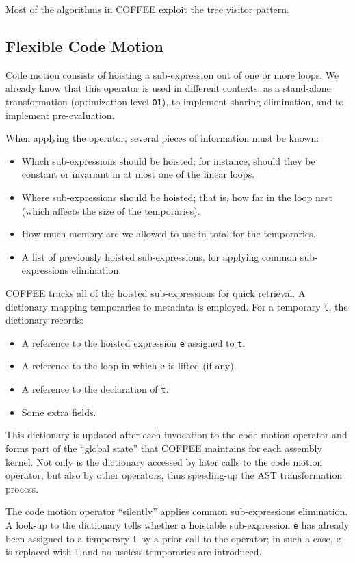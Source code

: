 Most of the algorithms in COFFEE exploit the tree visitor pattern.

\subsection{Flexible Code Motion}
\label{sec:coffee:cm}
Code motion consists of hoisting a sub-expression out of one or more loops. We already know that this operator is used in different contexts: as a stand-alone transformation (optimization level \texttt{O1}), to implement sharing elimination, and to implement pre-evaluation. 

When applying the operator, several pieces of information must be known:
\begin{itemize}
\item Which sub-expressions should be hoisted; for instance, should they be constant or invariant in at most one of the linear loops.
\item Where sub-expressions should be hoisted; that is, how far in the loop nest (which affects the size of the temporaries).
\item How much memory are we allowed to use in total for the temporaries.
\item A list of previously hoisted sub-expressions, for applying common sub-expressions elimination.
\end{itemize}

COFFEE tracks all of the hoisted sub-expressions for quick retrieval. A dictionary mapping temporaries to metadata is employed. For a temporary \texttt{t}, the dictionary records:
\begin{itemize}
\item A reference to the hoisted expression \texttt{e} assigned to \texttt{t}.
\item A reference to the loop in which \texttt{e} is lifted (if any).
\item A reference to the declaration of \texttt{t}.
\item Some extra fields.
\end{itemize}
This dictionary is updated after each invocation to the code motion operator and forms part of the ``global state'' that COFFEE maintains for each assembly kernel. Not only is the dictionary accessed by later calls to the code motion operator, but also by other operators, thus speeding-up the AST transformation process.

The code motion operator ``silently'' applies common sub-expressions elimination. A look-up to the dictionary tells whether a hoistable sub-expression \texttt{e} has already been assigned to a temporary \texttt{t} by a prior call to the operator; in such a case, \texttt{e} is replaced with \texttt{t} and no useless temporaries are introduced. 

